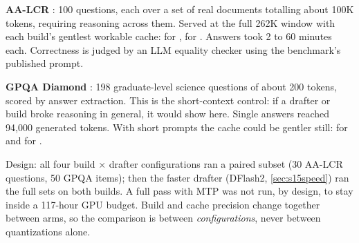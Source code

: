 \textbf{AA-LCR} \citep{artificialanalysis2026aalcr}: 100 questions, each over a set of real documents
totalling about 100K tokens, requiring reasoning across them. Served at the full 262K window with each
build's gentlest workable cache:  for \Qsix,  for \Qfour. Answers took 2 to 60
minutes each. Correctness is judged by an LLM equality checker using the benchmark's published prompt.

\textbf{GPQA Diamond} \citep{rein2023gpqa}: 198 graduate-level science questions of about 200 tokens,
scored by answer extraction. This is the short-context control: if a drafter or build broke reasoning
in general, it would show here. Single answers reached 94{,}000 generated tokens. With short prompts
the cache could be gentler still:  for \Qsix{} and  for \Qfour.

Design: all four build $\times$ drafter configurations ran a paired subset (30 AA-LCR questions, 50
GPQA items); then the faster drafter (DFlash2, \cref{sec:s15speed}) ran the full sets on both builds.
A full pass with MTP was not run, by design, to stay inside a 117-hour GPU budget. Build and cache
precision change together between arms, so the comparison is between \emph{configurations}, never
between quantizations alone.


